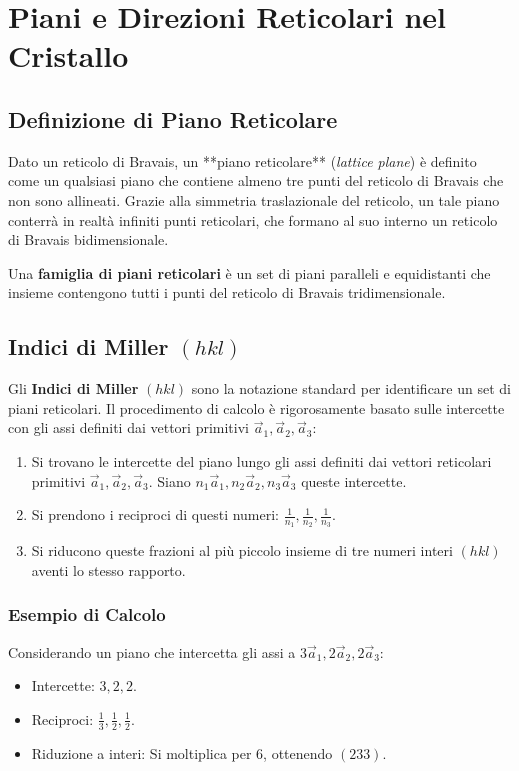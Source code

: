 \section{Piani e Direzioni Reticolari nel Cristallo}

\subsection{Definizione di Piano Reticolare}

Dato un reticolo di Bravais, un **piano reticolare** (\textit{lattice plane}) è definito come un qualsiasi piano che contiene almeno tre punti del reticolo di Bravais che non sono allineati. Grazie alla simmetria traslazionale del reticolo, un tale piano conterrà in realtà infiniti punti reticolari, che formano al suo interno un reticolo di Bravais bidimensionale.

Una \textbf{famiglia di piani reticolari} è un set di piani paralleli e equidistanti che insieme contengono tutti i punti del reticolo di Bravais tridimensionale.

\subsection{Indici di Miller \texorpdfstring{$(hkl)$}{(hkl)}}

Gli \textbf{Indici di Miller} $(hkl)$ sono la notazione standard per identificare un set di piani reticolari. Il procedimento di calcolo è rigorosamente basato sulle intercette con gli assi definiti dai vettori primitivi $\vec{a}_1, \vec{a}_2, \vec{a}_3$:

\begin{enumerate}
    \item Si trovano le intercette del piano lungo gli assi definiti dai vettori reticolari primitivi $\vec{a}_1, \vec{a}_2, \vec{a}_3$. Siano $n_1 \vec{a}_1, n_2 \vec{a}_2, n_3 \vec{a}_3$ queste intercette.
    \item Si prendono i reciproci di questi numeri: $\frac{1}{n_1}, \frac{1}{n_2}, \frac{1}{n_3}$.
    \item Si riducono queste frazioni al più piccolo insieme di tre numeri interi $(hkl)$ aventi lo stesso rapporto.
\end{enumerate}

\subsubsection{Esempio di Calcolo}
Considerando un piano che intercetta gli assi a $3\vec{a}_1, 2\vec{a}_2, 2\vec{a}_3$:
\begin{itemize}
    \item Intercette: $3, 2, 2$.
    \item Reciproci: $\frac{1}{3}, \frac{1}{2}, \frac{1}{2}$.
    \item Riduzione a interi: Si moltiplica per 6, ottenendo $(233)$.
\end{itemize}


